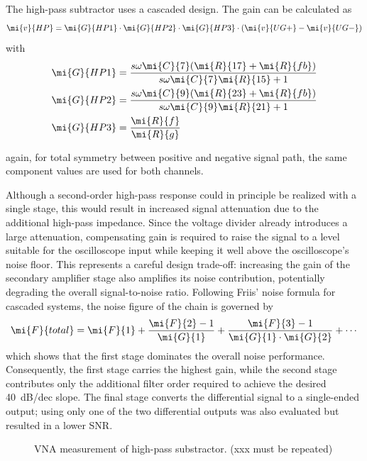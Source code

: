 The high-pass subtractor uses a cascaded design.
The gain can be calculated as
\begin{equation}
	\mi{v}{HP} = \mi{G}{HP1} \cdot \mi{G}{HP2} \cdot \mi{G}{HP3} \cdot (\mi{v}{UG+} - \mi{v}{UG-})
\end{equation}
with
\begin{align}
	\mi{G}{HP1} &= \frac{s\omega \mi{C}{7}(\mi{R}{17}+ \mi{R}{fb})}{s\omega \mi{C}{7}\mi{R}{15}+1}\\
	\mi{G}{HP2} &= \frac{s\omega \mi{C}{9}(\mi{R}{23}+ \mi{R}{fb})}{s\omega \mi{C}{9}\mi{R}{21}+1}\\
	\mi{G}{HP3} &= \frac{\mi{R}{f}}{\mi{R}{g}}
\end{align}

again, for total symmetry between positive and negative signal path, the same component values are used for both channels.
	

Although a second-order high-pass response could in principle be realized with a single stage, this would result in increased signal attenuation due to the additional high-pass impedance.
Since the voltage divider already introduces a large attenuation, compensating gain is required to raise the signal to a level suitable for the oscilloscope input while keeping it well above the oscilloscope's noise floor.
This represents a careful design trade-off: increasing the gain of the secondary amplifier stage also amplifies its noise contribution, potentially degrading the overall signal-to-noise ratio.
Following Friis' noise formula for cascaded systems, the noise figure of the chain is governed by
\begin{equation}
	\mi{F}{total} = \mi{F}{1} + \frac{\mi{F}{2}-1}{\mi{G}{1}} + \frac{\mi{F}{3}-1}{\mi{G}{1}\cdot\mi{G}{2}} + \cdots
\end{equation}
which shows that the first stage dominates the overall noise performance.
Consequently, the first stage carries the highest gain, while the second stage contributes only the additional filter order required to achieve the desired \SI{+40}{dB/dec} slope.
The final stage converts the differential signal to a single-ended output; using only one of the two differential outputs was also evaluated but resulted in a lower SNR.


\begin{figure}[ht]
	\centering
	
	\caption{VNA measurement of high-pass substractor. (xxx must be repeated)}\label{fig:VNA_rawHP}
\end{figure}

